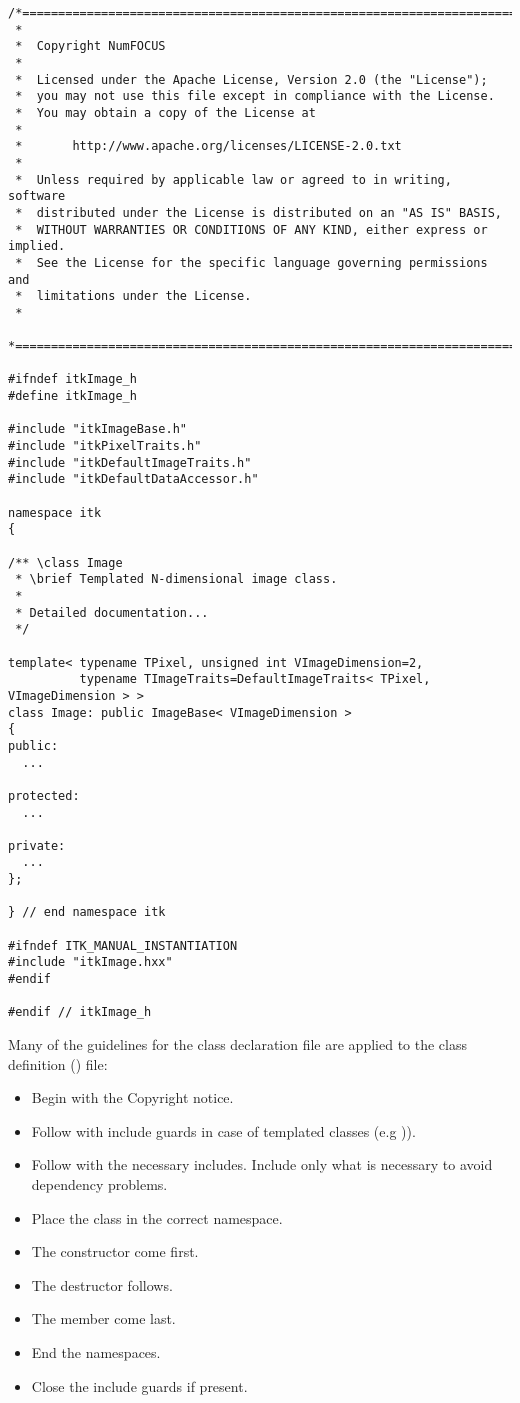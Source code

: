 \small
\begin{verbatim}
/*=========================================================================
 *
 *  Copyright NumFOCUS
 *
 *  Licensed under the Apache License, Version 2.0 (the "License");
 *  you may not use this file except in compliance with the License.
 *  You may obtain a copy of the License at
 *
 *       http://www.apache.org/licenses/LICENSE-2.0.txt
 *
 *  Unless required by applicable law or agreed to in writing, software
 *  distributed under the License is distributed on an "AS IS" BASIS,
 *  WITHOUT WARRANTIES OR CONDITIONS OF ANY KIND, either express or implied.
 *  See the License for the specific language governing permissions and
 *  limitations under the License.
 *
 *=========================================================================*/

#ifndef itkImage_h
#define itkImage_h

#include "itkImageBase.h"
#include "itkPixelTraits.h"
#include "itkDefaultImageTraits.h"
#include "itkDefaultDataAccessor.h"

namespace itk
{

/** \class Image
 * \brief Templated N-dimensional image class.
 *
 * Detailed documentation...
 */

template< typename TPixel, unsigned int VImageDimension=2,
          typename TImageTraits=DefaultImageTraits< TPixel, VImageDimension > >
class Image: public ImageBase< VImageDimension >
{
public:
  ...

protected:
  ...

private:
  ...
};

} // end namespace itk

#ifndef ITK_MANUAL_INSTANTIATION
#include "itkImage.hxx"
#endif

#endif // itkImage_h
\end{verbatim}
\normalsize

Many of the guidelines for the class declaration file are applied to the class
definition () file:
\begin{itemize}
\item Begin with the Copyright notice.
\item Follow with include guards in case of templated classes (e.g
)).
\item Follow with the necessary includes. Include only what is necessary to
avoid dependency problems.
\item Place the class in the correct namespace.
\item The constructor come first.
\item The destructor follows.
\item The  member come last.
\item End the namespaces.
\item Close the include guards if present.
\end{itemize}

